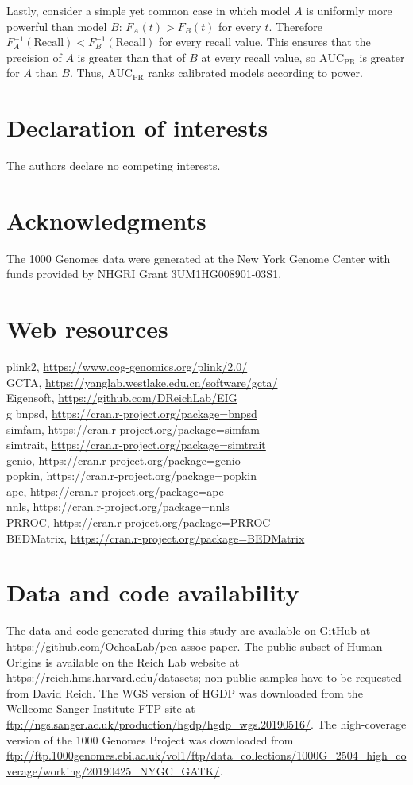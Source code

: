 \documentclass[11pt]{article}
\newcommand{\auc}{\text{AUC}_\text{PR}}
\begin{document}
Lastly, consider a simple yet common case in which model $A$ is uniformly more powerful than model $B$: $F_A(t) > F_B(t)$ for every $t$.
Therefore $F_A^{-1}( \text{Recall} ) < F_B^{-1}( \text{Recall} )$ for every recall value.
This ensures that the precision of $A$ is greater than that of $B$ at every recall value, so $\auc$ is greater for $A$ than $B$.
Thus, $\auc$ ranks calibrated models according to power.


\section*{Declaration of interests}
The authors declare no competing interests.

\section*{Acknowledgments}
The 1000 Genomes data were generated at the New York Genome Center with funds provided by NHGRI Grant 3UM1HG008901-03S1.

\section*{Web resources}
plink2, \url{https://www.cog-genomics.org/plink/2.0/}\\
GCTA, \url{https://yanglab.westlake.edu.cn/software/gcta/}\\
Eigensoft, \url{https://github.com/DReichLab/EIG}\\g
bnpsd, \url{https://cran.r-project.org/package=bnpsd}\\
simfam, \url{https://cran.r-project.org/package=simfam}\\
simtrait, \url{https://cran.r-project.org/package=simtrait}\\
genio, \url{https://cran.r-project.org/package=genio}\\
popkin, \url{https://cran.r-project.org/package=popkin}\\
ape, \url{https://cran.r-project.org/package=ape}\\
nnls, \url{https://cran.r-project.org/package=nnls}\\
PRROC, \url{https://cran.r-project.org/package=PRROC}\\
BEDMatrix, \url{https://cran.r-project.org/package=BEDMatrix}

\section*{Data and code availability}
The data and code generated during this study are available on GitHub at \url{https://github.com/OchoaLab/pca-assoc-paper}.
The public subset of Human Origins is available on the Reich Lab website at \url{https://reich.hms.harvard.edu/datasets}; non-public samples have to be requested from David Reich.
The WGS version of HGDP was downloaded from the Wellcome Sanger Institute FTP site at \url{ftp://ngs.sanger.ac.uk/production/hgdp/hgdp_wgs.20190516/}.
The high-coverage version of the 1000 Genomes Project was downloaded from \url{ftp://ftp.1000genomes.ebi.ac.uk/vol1/ftp/data_collections/1000G_2504_high_coverage/working/20190425_NYGC_GATK/}.
\end{document}
